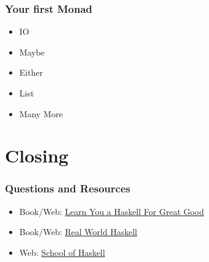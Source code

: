 \begin{frame}[t,fragile]
    \frametitle{Your first Monad}
    \begin{overprint}
        \begin{itemize}
            \item<4-> IO
            \item<5-> Maybe
            \item<6-> Either
            \item<7-> List
            \item<8-> Many More
        \end{itemize}

    \end{overprint}
\end{frame}


\section{Closing}
\begin{frame}[t,fragile]
    \frametitle{Questions and Resources}
    \begin{itemize}
        \item<1-|handout:1-> Book/Web: \href{http://learnyouahaskell.com/}{Learn You a Haskell For Great Good}
        \item<1-|handout:1-> Book/Web: \href{http://book.realworldhaskell.org/}{Real World Haskell}
        \item<1-|handout:1-> Web:      \href{https://www.fpcomplete.com/}{School of Haskell}
    \end{itemize}

\end{frame}

